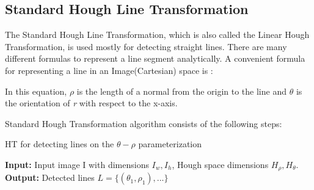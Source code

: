 \subsection{Standard Hough Line Transformation}\label{sec:Standard Hough Line Transformation}
%
The Standard Hough Line Transformation, which is also called the Linear Hough Transformation, is used mostly for detecting straight lines. There are many different formulas to represent a line segment analytically. A convenient formula for representing a line in an Image(Cartesian) space is :

  \begin{center}


  \end{center}
  
In this equation, \textit{$ \rho $} is the length of a normal from the origin to the line and \textit{$ \theta $} is the orientation of \textit{r} with respect to the x-axis.
 

 
Standard Hough Transformation algorithm consists of the following steps: 
 
\begin{algorithm}[h]

 \caption{ HT for detecting lines on the $\theta - \rho$ parameterization}
\begin{algorithmic}[1]
        \newline
        \textbf{Input: }Input image I with dimensions $I_{w},I_{h}$, Hough space dimensions $H_{\rho},H_{\theta}$.\newline
        \textbf{Output:} Detected lines $L=\lbrace(\theta_{1},\rho_{1}),...\rbrace$ 
         \EndIf
         \EndFor
        
        \EndProcedure
 \end{algorithmic}    
 \end{algorithm}
 
